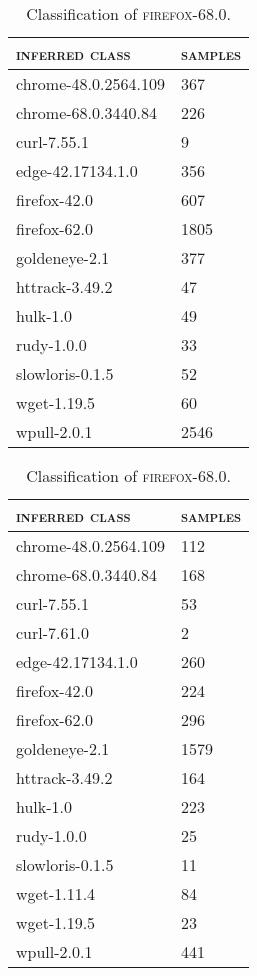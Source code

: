\begin{table}[H]
	\centering
	\begin{subtable}{.45\linewidth}
		\centering
	\begin{tabular}{ll}
		\toprule
		\textsc{inferred class} & \textsc{samples}\\
		\midrule
		chrome-48.0.2564.109 & 367\\
		chrome-68.0.3440.84 & 226\\
		curl-7.55.1 & 9\\
		edge-42.17134.1.0 & 356\\
		firefox-42.0 & 607\\
		firefox-62.0 & 1805\\
		goldeneye-2.1 & 377\\
		httrack-3.49.2 & 47\\
		hulk-1.0 & 49\\
		rudy-1.0.0 & 33\\
		slowloris-0.1.5 & 52\\
		wget-1.19.5 & 60\\
		wpull-2.0.1 & 2546\\
		\bottomrule
	\end{tabular}
	\caption{Classification of \textsc{firefox-68.0}.}
	\end{subtable}
	\begin{subtable}{.45\linewidth}
		\centering
	\begin{tabular}{ll}
		\toprule
		\textsc{inferred class} & \textsc{samples}\\
		\midrule
		chrome-48.0.2564.109 & 112\\
		chrome-68.0.3440.84 & 168\\
		curl-7.55.1 & 53\\
		curl-7.61.0 & 2\\
		edge-42.17134.1.0 & 260\\
		firefox-42.0 & 224\\
		firefox-62.0 & 296\\
		goldeneye-2.1 & 1579\\
		httrack-3.49.2 & 164\\
		hulk-1.0 & 223\\
		rudy-1.0.0 & 25\\
		slowloris-0.1.5 & 11\\
		wget-1.11.4 & 84\\
		wget-1.19.5 & 23\\
		wpull-2.0.1 & 441\\
		\bottomrule
	\end{tabular}

\end{subtable}
\end{table}

